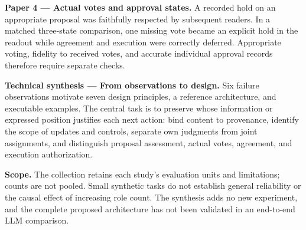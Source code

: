 \documentclass[10pt,a4paper]{article}
\begin{document}
\textbf{Paper 4 — Actual votes and approval states.} A recorded hold on an appropriate proposal was faithfully respected by subsequent readers. In a matched three-state comparison, one missing vote became an explicit hold in the readout while agreement and execution were correctly deferred. Appropriate voting, fidelity to received votes, and accurate individual approval records therefore require separate checks.

\textbf{Technical synthesis — From observations to design.} Six failure observations motivate seven design principles, a reference architecture, and executable examples. The central task is to preserve whose information or expressed position justifies each next action: bind content to provenance, identify the scope of updates and controls, separate own judgments from joint assignments, and distinguish proposal assessment, actual votes, agreement, and execution authorization.

\textbf{Scope.} The collection retains each study's evaluation units and limitations; counts are not pooled. Small synthetic tasks do not establish general reliability or the causal effect of increasing role count. The synthesis adds no new experiment, and the complete proposed architecture has not been validated in an end-to-end LLM comparison.
\end{document}
